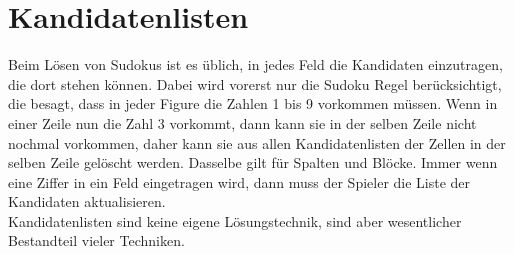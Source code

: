 \section{Kandidatenlisten}
\label{Kandidatenlisten}
Beim Lösen von Sudokus ist es üblich, in jedes Feld die Kandidaten einzutragen, die dort stehen können. Dabei wird vorerst nur die Sudoku Regel berücksichtigt, die besagt, dass in jeder Figure die Zahlen 1 bis 9 vorkommen müssen. Wenn in einer Zeile nun die Zahl 3 vorkommt, dann kann sie in der selben Zeile nicht nochmal vorkommen, daher kann sie aus allen Kandidatenlisten der Zellen in der selben Zeile gelöscht werden. Dasselbe gilt für Spalten und Blöcke. Immer wenn eine Ziffer in ein Feld eingetragen wird, dann muss der Spieler die Liste der Kandidaten aktualisieren.\\
Kandidatenlisten sind keine eigene Lösungstechnik, sind aber wesentlicher Bestandteil vieler Techniken.